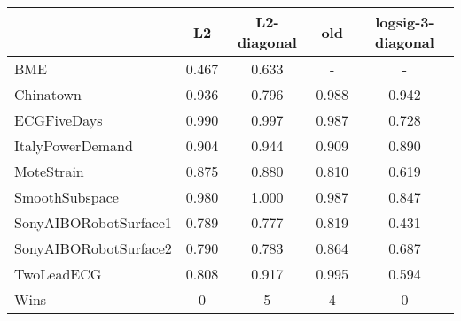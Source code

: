 \begin{tabular}{lcccc}
\toprule
{} &    L2 &  L2-diagonal &   old &  logsig-3-diagonal \\
\midrule
BME                   & 0.467 &        0.633 &     - &                  - \\
Chinatown             & 0.936 &        0.796 & 0.988 &              0.942 \\
ECGFiveDays           & 0.990 &        0.997 & 0.987 &              0.728 \\
ItalyPowerDemand      & 0.904 &        0.944 & 0.909 &              0.890 \\
MoteStrain            & 0.875 &        0.880 & 0.810 &              0.619 \\
SmoothSubspace        & 0.980 &        1.000 & 0.987 &              0.847 \\
SonyAIBORobotSurface1 & 0.789 &        0.777 & 0.819 &              0.431 \\
SonyAIBORobotSurface2 & 0.790 &        0.783 & 0.864 &              0.687 \\
TwoLeadECG            & 0.808 &        0.917 & 0.995 &              0.594 \\ 
\midrule
Wins &   0 &            5 &    4 &                  0 \\
\bottomrule
\end{tabular}
